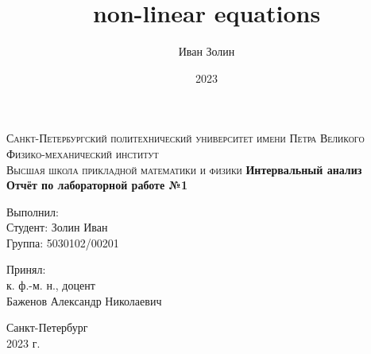 \documentclass[a4paper,14pt]{article}
\title{non-linear equations}
\author{Иван Золин}
\date{2023}
\begin{document}
	
	\begin{titlepage}
		\begin{center}
			\textsc{
				Санкт-Петербургский политехнический университет имени Петра Великого \\[5mm]
				Физико-механический институт\\[2mm]
				Высшая школа прикладной математики и физики            
			}   
			\vfill
			\textbf{\large
				Интервальный анализ\\
				Отчёт по лабораторной работе №1 \\[3mm]
			}                
		\end{center}
		
		\vfill
		\hfill
		\begin{minipage}{0.5\textwidth}
			Выполнил: \\[2mm]   
			Студент: Золин Иван \\
			Группа: 5030102/00201\\
		\end{minipage}
		
		\hfill
		\begin{minipage}{0.5\textwidth}
			Принял: \\[2mm]
			к. ф.-м. н., доцент \\   
			Баженов Александр Николаевич
		\end{minipage}
		
		\vfill
		\begin{center}
			Санкт-Петербург \\2023 г.
		\end{center}
	\end{titlepage}
	
	\tableofcontents
	\newpage
	\listoffigures
	\newpage
	\listoftables
	\newpage
	
\end{document}
